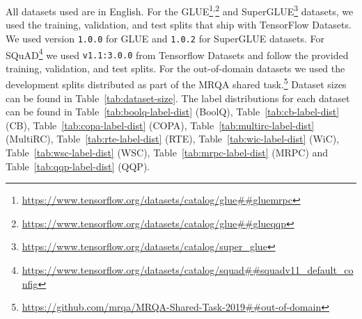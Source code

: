 \documentclass[11pt]{article}
\begin{document}
All datasets used are in English. For the GLUE\footnote{\url{https://www.tensorflow.org/datasets/catalog/glue##gluemrpc}}\textsuperscript{,}\footnote{\url{https://www.tensorflow.org/datasets/catalog/glue##glueqqp}} and SuperGLUE\footnote{\url{https://www.tensorflow.org/datasets/catalog/super_glue}} datasets, we used the training, validation, and test splits that ship with TensorFlow Datasets. We used version {\tt 1.0.0} for GLUE and {\tt 1.0.2} for SuperGLUE datasets. For SQuAD\footnote{\url{https://www.tensorflow.org/datasets/catalog/squad##squadv11_default_config}} we used {\tt v1.1:3.0.0} from Tensorflow Datasets and follow the provided training, validation, and test splits. For the out-of-domain datasets we used the development splits distributed as part of the MRQA shared task.\footnote{\url{https://github.com/mrqa/MRQA-Shared-Task-2019##out-of-domain}} Dataset sizes can be found in Table~\ref{tab:dataset-size}. The label distributions for each dataset can be found in Table~\ref{tab:boolq-label-dist} (BoolQ), Table~\ref{tab:cb-label-dist} (CB), Table~\ref{tab:copa-label-dist} (COPA), Table~\ref{tab:multirc-label-dist} (MultiRC), Table~\ref{tab:rte-label-dist} (RTE), Table~\ref{tab:wic-label-dist} (WiC), Table~\ref{tab:wsc-label-dist} (WSC), Table~\ref{tab:mrpc-label-dist} (MRPC) and Table~\ref{tab:qqp-label-dist} (QQP).
\end{document}

